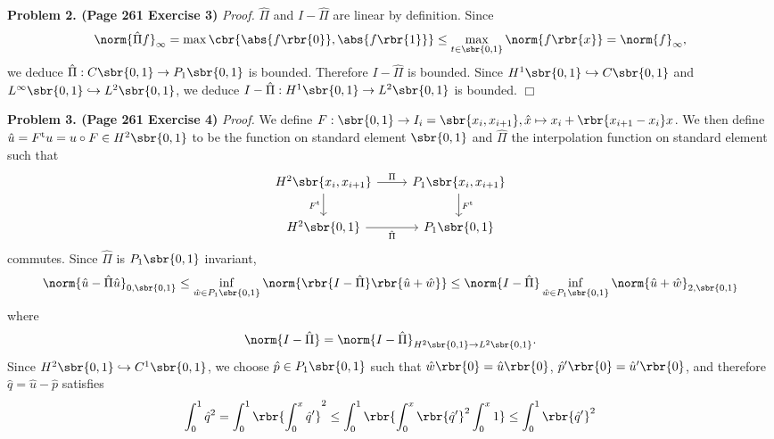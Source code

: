 \documentclass[english, nochinese]{pnote}
\begin{document}
\textbf{Problem 2. (Page 261 Exercise 3)} \textit{Proof.} $\hat{\Pi}$ and $ I - \hat{\Pi} $ are linear by definition. Since
\begin{equation}
\norm{ \hat{\Pi} f }_{\infty} = \max \cbr{ \abs{ f \rbr{0} }, \abs{ f \rbr{1} } } \le \max_{ t \in \sbr{ 0, 1 } } \norm{ f \rbr{x} } = \norm{f}_{\infty},
\end{equation}
we deduce $ \hat{\Pi} : C \sbr{ 0, 1 } \rightarrow P_1 \sbr{ 0, 1 } $ is bounded. Therefore $ I - \hat{\Pi} $ is bounded. Since $ H^1 \sbr{ 0, 1 } \hookrightarrow C \sbr{ 0, 1 } $ and $ L^{\infty} \sbr{ 0, 1 } \hookrightarrow L^2 \sbr{ 0, 1 } $, we deduce $ I - \hat{\Pi} : H^1 \sbr{ 0, 1 } \rightarrow L^2 \sbr{ 0, 1 } $ is bounded.
\hfill$\Box$

\textbf{Problem 3. (Page 261 Exercise 4)} \textit{Proof.} We define $ F : \sbr{ 0, 1 } \rightarrow I_i = \sbr{ x_i, x_{ i + 1 } }, \hat{x} \mapsto x_i + \rbr{ x_{ i + 1 } - x_i } x $. We then define $ \hat{u} = F^{\text{t}} u = u \circ F \in H^2 \sbr{ 0, 1 } $ to be the function on standard element $ \sbr{ 0, 1 } $ and $\hat{\Pi}$ the interpolation function on standard element such that
\begin{equation}
\begin{tikzcd}
H^2 \sbr{ x_i, x_{ i + 1 } } \arrow[r, "\Pi"] \arrow[d, "F^{\text{t}}"'] & P_1 \sbr{ x_i, x_{ i + 1 } } \arrow[d, "F^{\text{t}}"] \\
H^2 \sbr{ 0, 1 } \arrow[r, "\hat{\Pi}"'] & P_1 \sbr{ 0, 1 }
\end{tikzcd}
\end{equation}
commutes. Since $\hat{\Pi}$ is $ P_1 \sbr{ 0, 1 } $ invariant,
\begin{equation}
\norm{ \hat{u} - \hat{\Pi} \hat{u} }_{ 0, \sbr{ 0, 1 } } \le \inf_{ \hat{w} \in P_1 \sbr{ 0, 1 } } \norm{ \rbr{ I - \hat{\Pi} } \rbr{ \hat{u} + \hat{w} } } \le \norm{ I - \hat{\Pi} } \inf_{ \hat{w} \in P_1 \sbr{ 0, 1 } } \norm{ \hat{u} + \hat{w} }_{ 2, \sbr{ 0, 1 } }
\end{equation}
where
\begin{equation}
\norm{ I - \hat{\Pi} } = \norm{ I - \hat{\Pi} }_{ H^2 \sbr{ 0, 1 } \rightarrow L^2 \sbr{ 0, 1 } }.
\end{equation}
Since $ H^2 \sbr{ 0, 1 } \hookrightarrow C^1 \sbr{ 0, 1 } $, we choose $ \hat{p} \in P_1 \sbr{ 0, 1 } $ such that $ \hat{w} \rbr{0} = \hat{u} \rbr{0} $, $ \hat{p}' \rbr{0} = \hat{u}' \rbr{0} $, and therefore $ \hat{q} = \hat{u} - \hat{p} $ satisfies
\begin{equation}
\int_0^1 \hat{q}^2 = \int_0^1 \rbr{ \int_0^x \hat{q}' }^2 \le \int_0^1 \rbr{ \int_0^x \rbr{\hat{q}'}^2 \int_0^x 1 } \le \int_0^1 \rbr{\hat{q}'}^2
\end{equation}
\end{document}
